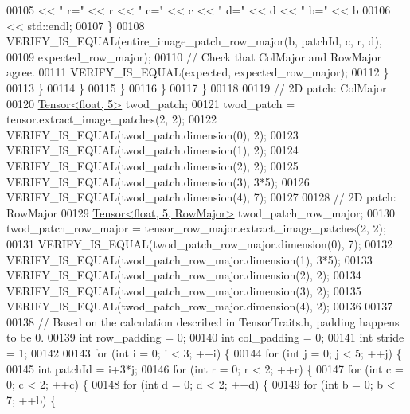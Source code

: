 \begin{DoxyCode}
00105                      << \textcolor{stringliteral}{" r="} << r << \textcolor{stringliteral}{" c="} << c << \textcolor{stringliteral}{" d="} << d << \textcolor{stringliteral}{" b="} << b
00106                      << std::endl;
00107               \}
00108               VERIFY\_IS\_EQUAL(entire\_image\_patch\_row\_major(b, patchId, c, r, d),
00109                               expected\_row\_major);
00110               \textcolor{comment}{// Check that ColMajor and RowMajor agree.}
00111               VERIFY\_IS\_EQUAL(expected, expected\_row\_major);
00112             \}
00113           \}
00114         \}
00115       \}
00116     \}
00117   \}
00118 
00119   \textcolor{comment}{// 2D patch: ColMajor}
00120   \hyperlink{class_eigen_1_1_tensor}{Tensor<float, 5>} twod\_patch;
00121   twod\_patch = tensor.extract\_image\_patches(2, 2);
00122   VERIFY\_IS\_EQUAL(twod\_patch.dimension(0), 2);
00123   VERIFY\_IS\_EQUAL(twod\_patch.dimension(1), 2);
00124   VERIFY\_IS\_EQUAL(twod\_patch.dimension(2), 2);
00125   VERIFY\_IS\_EQUAL(twod\_patch.dimension(3), 3*5);
00126   VERIFY\_IS\_EQUAL(twod\_patch.dimension(4), 7);
00127 
00128   \textcolor{comment}{// 2D patch: RowMajor}
00129   \hyperlink{class_eigen_1_1_tensor}{Tensor<float, 5, RowMajor>} twod\_patch\_row\_major;
00130   twod\_patch\_row\_major = tensor\_row\_major.extract\_image\_patches(2, 2);
00131   VERIFY\_IS\_EQUAL(twod\_patch\_row\_major.dimension(0), 7);
00132   VERIFY\_IS\_EQUAL(twod\_patch\_row\_major.dimension(1), 3*5);
00133   VERIFY\_IS\_EQUAL(twod\_patch\_row\_major.dimension(2), 2);
00134   VERIFY\_IS\_EQUAL(twod\_patch\_row\_major.dimension(3), 2);
00135   VERIFY\_IS\_EQUAL(twod\_patch\_row\_major.dimension(4), 2);
00136 
00137 
00138   \textcolor{comment}{// Based on the calculation described in TensorTraits.h, padding happens to be 0.}
00139   \textcolor{keywordtype}{int} row\_padding = 0;
00140   \textcolor{keywordtype}{int} col\_padding = 0;
00141   \textcolor{keywordtype}{int} stride = 1;
00142 
00143   \textcolor{keywordflow}{for} (\textcolor{keywordtype}{int} i = 0; i < 3; ++i) \{
00144     \textcolor{keywordflow}{for} (\textcolor{keywordtype}{int} j = 0; j < 5; ++j) \{
00145       \textcolor{keywordtype}{int} patchId = i+3*j;
00146       \textcolor{keywordflow}{for} (\textcolor{keywordtype}{int} r = 0; r < 2; ++r) \{
00147         \textcolor{keywordflow}{for} (\textcolor{keywordtype}{int} c = 0; c < 2; ++c) \{
00148           \textcolor{keywordflow}{for} (\textcolor{keywordtype}{int} d = 0; d < 2; ++d) \{
00149             \textcolor{keywordflow}{for} (\textcolor{keywordtype}{int} b = 0; b < 7; ++b) \{

\end{DoxyCode}
